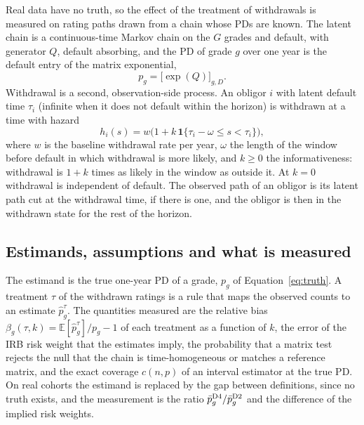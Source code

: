 Real data have no truth, so the effect of the treatment of withdrawals is measured on rating paths drawn from a chain whose PDs are known. The latent chain is a continuous-time Markov chain on the $G$ grades and default, with generator $Q$, default absorbing, and the PD of grade $g$ over one year is the default entry of the matrix exponential,
\begin{equation}
p_g=\bigl[\exp(Q)\bigr]_{g,D}.
\label{eq:truth}
\end{equation}
Withdrawal is a second, observation-side process. An obligor $i$ with latent default time $\tau_i$ (infinite when it does not default within the horizon) is withdrawn at a time with hazard %
\begin{equation}
h_i(s)=w\bigl(1+k\,\mathbf 1\{\tau_i-\omega\le s<\tau_i\}\bigr),
\label{eq:withdrawal-hazard}
\end{equation}
where $w$ is the baseline withdrawal rate per year, $\omega$ the length of the window before default in which withdrawal is more likely, and $k\ge 0$ the informativeness: withdrawal is $1+k$ times as likely in the window as outside it. At $k=0$ withdrawal is independent of default. The observed path of an obligor is its latent path cut at the withdrawal time, if there is one, and the obligor is then in the withdrawn state for the rest of the horizon. %

\subsection{Estimands, assumptions and what is measured}
\label{sec:problem-estimands}

The estimand is the true one-year PD of a grade, $p_g$ of Equation~\eqref{eq:truth}. A treatment $\tau$ of the withdrawn ratings is a rule that maps the observed counts to an estimate $\hat p^{\tau}_g$. The quantities measured are the relative bias $\beta_g(\tau,k)=\mathbb E[\hat p^{\tau}_g]/p_g-1$ of each treatment as a function of $k$, the error of the IRB risk weight that the estimates imply, the probability that a matrix test rejects the null that the chain is time-homogeneous or matches a reference matrix, and the exact coverage $c(n,p)$ of an interval estimator at the true PD. On real cohorts the estimand is replaced by the gap between definitions, since no truth exists, and the measurement is the ratio $\bar p^{\mathrm{D4}}_g/\bar p^{\mathrm{D2}}_g$ and the difference of the implied risk weights. %

